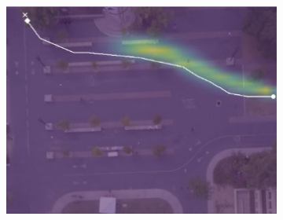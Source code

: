 \documentclass[letterpaper,10pt,conference]{ieeeconf}
\begin{document}
\begin{figure}[t!]
\begin{subfigure}[t]{0.48\textwidth}
\begin{minipage}[c]{0.3\linewidth}
		\includegraphics[width=\linewidth]{./figures/bookstore/kit_1_2_t=370.jpg}
	\end{minipage}
	

\end{subfigure}
\end{figure}
\end{document}

